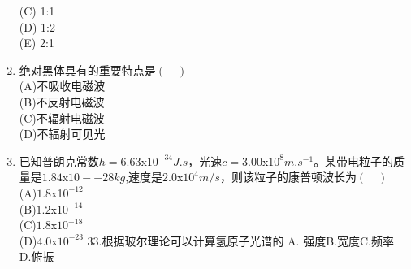 \begin{enumerate}
(C) 1:1\\
(D) 1:2\\
(E) 2:1
\item 绝对黑体具有的重要特点是$(\quad)$\\
(A)不吸收电磁波\\
(B)不反射电磁波\\
(C)不辐射电磁波\\
(D)不辐射可见光
\item 已知普朗克常数$h=6.63$x$10^{-34}J.s$，光速$c=3.00$x$10^8m.s^{-1}$。某带电粒子的质量是$1.84$x$10-{-28}kg$,速度是$2.0$x$10^4 m/s$，则该粒子的康普顿波长为$(\quad)$\\
(A)$1.8$x1$0^{-12}$\\
(B)$1.2$x$10^{-14}$\\
(C)$1.8$x$10^{-18}$\\
(D)$4.0$x$10^{-23}$
33.根据玻尔理论可以计算氢原子光谱的
A. 强度B.宽度C.频率
D.俯振
\end{enumerate}